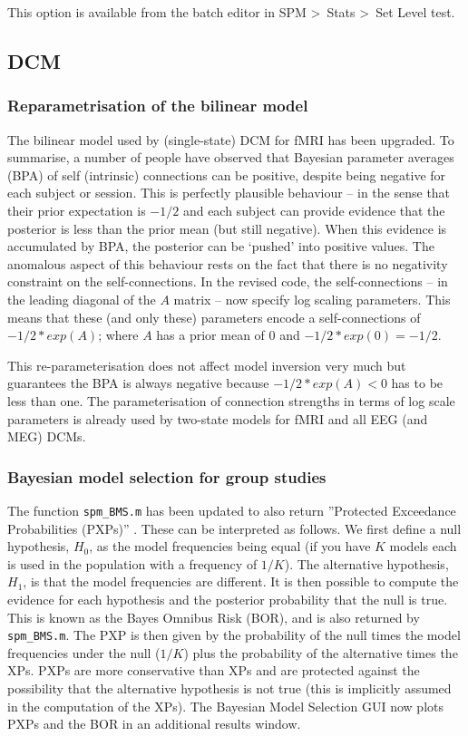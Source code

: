 \documentclass[a4paper,titlepage,openany]{article}
\begin{document}
This option is available from the batch editor in SPM \textgreater\ Stats \textgreater\ Set Level test.

\subsection{DCM}

\subsubsection{Reparametrisation of the bilinear model}

The bilinear model used by (single-state) DCM for fMRI has been upgraded. To summarise, a number of people have observed that Bayesian parameter averages (BPA) of self (intrinsic) connections can be positive, despite being negative for each subject or session. This is perfectly plausible behaviour -- in the sense that their prior expectation is $-1/2$ and each subject can provide evidence that the posterior is less than the prior mean (but still negative). When this evidence is accumulated by BPA, the posterior can be `pushed' into positive values. The anomalous aspect of this behaviour rests on the fact that there is no negativity constraint on the self-connections.  In the revised code, the self-connections -- in the leading diagonal of the $A$ matrix -- now specify log scaling parameters. This means that these (and only these) parameters encode a self-connections of $-1/2*exp(A)$; where $A$ has a prior mean of $0$ and $-1/2*exp(0) = -1/2$.

This re-parameterisation does not affect model inversion very much but guarantees the BPA is always negative because $-1/2*exp(A) < 0$ has to be less than one. The parameterisation of connection strengths in terms of log scale parameters is already used by two-state models for fMRI and all EEG (and MEG) DCMs.

\subsubsection{Bayesian model selection for group studies}

The function \texttt{spm\_BMS.m} has been updated to also return ''Protected Exceedance Probabilities (PXPs)'' \cite{Rigoux2014}.
These can be interpreted as follows. We first define a null hypothesis, $H_0$, as the model frequencies being equal (if you have $K$ models each is used in the population with a frequency of $1/K$). The alternative hypothesis, $H_1$, is that the model frequencies are different. It is then possible to compute the evidence for each hypothesis and the posterior probability that the null is true. This is known as the Bayes Omnibus Risk (BOR), and is also returned by \texttt{spm\_BMS.m}. The PXP is then given by the probability of the null times the model frequencies under the null ($1/K$) plus the probability of the alternative times the XPs. PXPs are more conservative than XPs and are protected against the possibility that the alternative hypothesis is not true (this is implicitly assumed in the computation of the XPs). The Bayesian Model Selection GUI now plots PXPs and the BOR in an additional results window.
\end{document}
